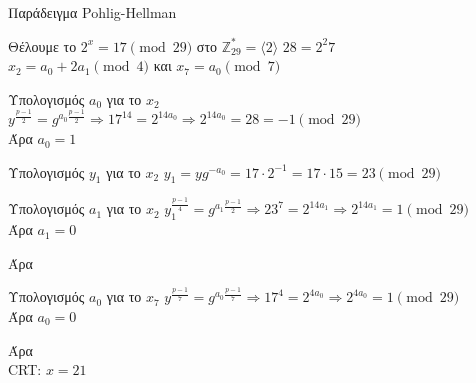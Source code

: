 \documentclass[handout]{beamer}
\begin{document}
\begin{frame}[allowframebreaks]{Παράδειγμα Pohlig-Hellman}
\begin{block}{Θέλουμε το $2^x = 17 \pmod{29}$ στο $\mathbb{Z}_{29}^*=\langle 2 \rangle$}
$28=2^2 7$ \\
$x_2 = a_0 + 2a_1 \pmod{4}$ και $x_7 = a_0 \pmod{7}$ \\
\end{block}

\begin{block}{Υπολογισμός $a_0$ για το $x_2$}
$y^\frac{p-1}{2} = g^{a_0 \frac{p-1}{2}} \Rightarrow 17^{14} = 2^{14 a_0} \Rightarrow  2^{14 a_0} = 28 = -1 \pmod{29}$ \\
Άρα $a_0=1$
\end{block}

\begin{block}{Υπολογισμός $y_1$ για το $x_2$}
$y_1 = y g^{-a_0} = 17 \cdot 2^{-1} = 17 \cdot 15 = 23 \pmod{29} $
\end{block}

\framebreak

\begin{block}{Υπολογισμός $a_1$ για το $x_2$}
$y_1^\frac{p-1}{4} = g^{a_1 \frac{p-1}{2}} \Rightarrow 23^7  = 2^{14 a_1} \Rightarrow 2^{14 a_1} = 1 \pmod{29}$\\
Άρα $a_1=0$ \\
\end{block}
Άρα 
 
\begin{block}{Υπολογισμός $a_0$ για το $x_7$}
$y^\frac{p-1}{7} = g^{a_0 \frac{p-1}{7}} \Rightarrow 17^4 = 2^{4 a_0} \Rightarrow  2^{4 a_0} = 1 \pmod{29}$ \\
Άρα $a_0=0$
\end{block}

Άρα 
\\
\alert{CRT}: $x = 21$
 
\end{frame}
\end{document}
